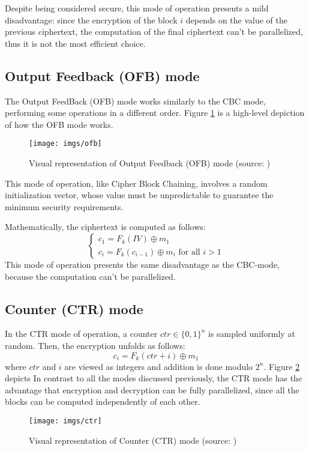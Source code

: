 \documentclass[target=mst,aauheader=aics]{thud}
\theoremstyle{definition}
\begin{document}
	Despite being considered secure, this mode of operation presents a mild disadvantage: since the encryption of the block $i$ depends on the value of the previous ciphertext, the computation of the final ciphertext can't be parallelized, thus it is not the most efficient choice.
 	\subsection{Output Feedback (OFB) mode}
 	The Output FeedBack (OFB) mode works similarly to the CBC mode, performing some operations in a different order. Figure \ref{fig:ofb} is a high-level depiction of how the OFB mode works.
 	\begin{figure}
 		\centering
 		\texttt{[image: imgs/ofb]}
 		\captionsetup{width=.7\linewidth}
 		\caption{Visual representation of Output Feedback (OFB) mode (source: \cite{Katz2007})}
 		\label{fig:ofb}
 	\end{figure}
 	This mode of operation, like Cipher Block Chaining, involves a random initialization vector, whose value must be unpredictable to guarantee the minimum security requirements.
 	
 	Mathematically, the ciphertext is computed as follows:
 	\[
 	\begin{cases}
 		c_1 = F_k(IV) \oplus m_1\\
 		c_i = F_k(c_{i-1}) \oplus m_i \text{ for all } i>1
 	\end{cases}
 	\]
 	This mode of operation presents the same disadvantage as the CBC-mode, because the computation can't be parallelized.
	\subsection{Counter (CTR) mode}
	In the CTR mode of operation, a counter $ctr \in \{0,1\}^n$ is sampled uniformly at random. Then, the encryption unfolds as follows:
	\[
		c_i = F_k(ctr + i) \oplus m_1
	\]
	where $ctr$ and $i$ are viewed as integers and addition is done modulo $2^n$. Figure \ref{fig:ctr} depicts In contrast to all the modes discussed previously, the CTR mode has the advantage that encryption and decryption can be fully parallelized, since all the blocks can be computed independently of each other.
	\begin{figure}
		\centering
		\texttt{[image: imgs/ctr]}
		\captionsetup{width=.7\linewidth}
		\caption{Visual representation of Counter (CTR) mode (source: \cite{Katz2007})}
		\label{fig:ctr}
	\end{figure}
	
\end{document}

